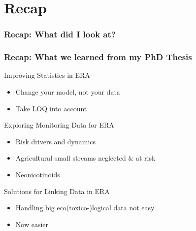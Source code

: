 \documentclass[
	12pt
	]{beamer}
\begin{document}
\section*{Recap}

\begingroup
\footnotesize %
\begin{frame}
\frametitle{Recap: What did I look at?}
    \vspace*{2mm}
	\resizebox{1.1\textwidth}{!}{
		\hspace*{-20mm}
	}
\end{frame}
\endgroup

\begin{frame}
\frametitle{Recap: What we learned from my PhD Thesis}
	\begin{exampleblock}{\checkmark Improving Statistics in ERA}
		\begin{itemize}
			\item Change your model, not your data
			\item Take LOQ into account
		\end{itemize}
	\end{exampleblock}

\pause
	\begin{exampleblock}{\checkmark Exploring Monitoring Data for ERA}
		\begin{itemize}
			\item Risk drivers and dynamics
			\item Agricultural small streams neglected \& at risk
			\item Neonicotinoids
		\end{itemize}
	\end{exampleblock}

\pause
	\begin{exampleblock}{\checkmark Solutions for Linking Data in ERA}
		\begin{itemize}
			\item Handling big eco(toxico-)logical data not easy
			\item Now easier
		\end{itemize}
	\end{exampleblock}
\end{frame}
\end{document}
